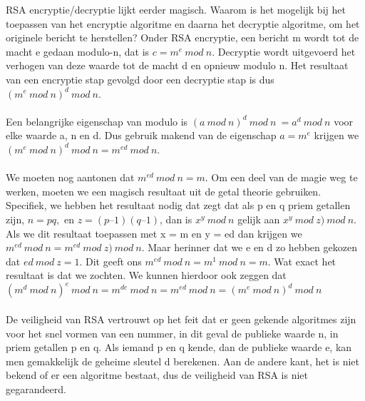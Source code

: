 
RSA encryptie/decryptie lijkt eerder magisch. Waarom is het mogelijk bij het toepassen van het encryptie algoritme en daarna het decryptie algoritme, om het originele bericht te herstellen? 
Onder RSA encryptie, een bericht m wordt tot de macht e gedaan modulo-n, dat is $c = m^e\ mod\ n$.
Decryptie wordt uitgevoerd het verhogen van deze waarde tot de macht d en opnieuw modulo n. Het resultaat van een encryptie stap gevolgd door een decryptie stap is dus $(m^e\ mod\ n)^d\ mod\ n$.
\\\\
Een belangrijke eigenschap van modulo is $(a\ mod\ n)^d\ mod\ n\ = a^d\ mod\ n$ voor elke waarde a, n en d. Dus gebruik makend van de eigenschap $a = m^e$ krijgen we $(m^e\ mod\ n)^d\ mod\ n = m^{ed}\ mod\ n$.
\\\\
We moeten nog aantonen dat $m^{ed}\ mod\ n = m$. Om een deel van de magie weg te werken, moeten we een magisch resultaat uit de getal theorie gebruiken. Specifiek, we hebben het resultaat nodig dat zegt dat als p en q priem getallen zijn, $n = pq, $ en $ z = (p – 1)(q – 1)$, dan is $x^y\ mod\ n$ gelijk aan $x^{y}\ mod\ z) \ mod\ n$. Als we dit resultaat toepassen met x = m en y = ed dan krijgen we $m^{ed}\ mod\ n = m^{ed}\ mod\ z) \ mod\ n$.
Maar herinner dat we e en d zo hebben gekozen dat $ed\ mod\ z = 1$. Dit geeft ons $m^{ed}\ mod\ n = m^1\ mod\ n = m$.
Wat exact het resultaat is dat we zochten. We kunnen hierdoor ook zeggen dat $(m^d\ mod\ n)^e\ mod\ n = m^{de}\ mod\ n = m^{ed}\ mod\ n = (m^e\ mod\ n)^d\ mod\ n$
\\\\
De veiligheid van RSA vertrouwt op het feit dat er geen gekende algoritmes zijn voor het snel vormen van een nummer, in dit geval de publieke waarde n, in priem getallen p en q. Als iemand p en q kende, dan de publieke waarde e, kan men gemakkelijk de geheime sleutel d berekenen.
Aan de andere kant, het is niet bekend of er een algoritme bestaat, dus de veiligheid van RSA is niet gegarandeerd.
